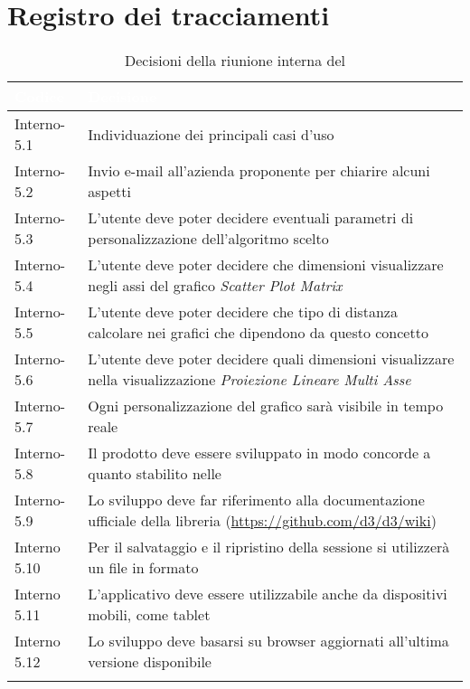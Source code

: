 \section{Registro dei tracciamenti}
{
\renewcommand{\arraystretch}{1.5}
\centering
\begin{longtable}{C{3cm} C{10cm}}
\textcolor{white}{\textbf{Codice}}&
\textcolor{white}{\textbf{Decisione}}\\	
\endhead
		
Interno-5.1 & Individuazione dei principali casi d'uso\\
Interno-5.2 & Invio e-mail all'azienda proponente per chiarire alcuni aspetti\\

Interno-5.3 & L'utente deve poter decidere eventuali parametri di personalizzazione dell'algoritmo scelto\\

Interno-5.4 & L'utente deve poter decidere che dimensioni visualizzare negli assi del grafico \textit{Scatter Plot Matrix}\\

Interno-5.5 & L'utente deve poter decidere che tipo di distanza calcolare nei grafici che dipendono da questo concetto\\

Interno-5.6 & L'utente deve poter decidere quali dimensioni visualizzare nella visualizzazione \textit{Proiezione Lineare Multi Asse}\\

Interno-5.7 & Ogni personalizzazione del grafico sarà visibile in tempo reale \\

Interno-5.8 & Il prodotto deve essere sviluppato in modo concorde a quanto stabilito nelle \NdPv{}\\

Interno-5.9 & Lo sviluppo deve far riferimento alla documentazione ufficiale della libreria  (\textcolor{blue}{\url{https://github.com/d3/d3/wiki}}) \\

Interno 5.10 & Per il salvataggio e il ripristino della sessione si utilizzerà un file in formato \\

Interno 5.11 & L'applicativo deve essere utilizzabile anche da dispositivi mobili, come tablet\\

Interno 5.12 & Lo sviluppo deve basarsi su browser aggiornati all'ultima versione disponibile\\

\caption{Decisioni della riunione interna del \Data{}}
		
\end{longtable}
}
